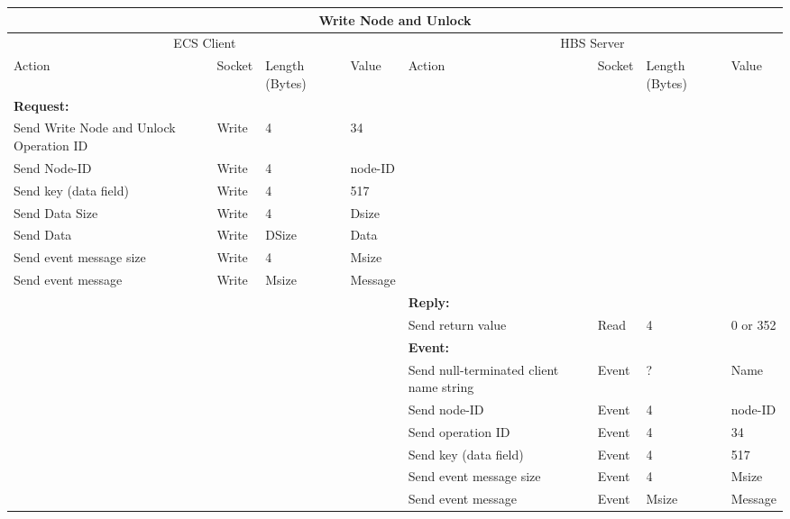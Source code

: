 \bigskip
\small
\begin{tabular}{|p{1.2in}|p{.4in}|p{.4in}|p{.5in}|p{1.2in}|p{.4in}|p{.4in}|p{.5in} |} \hline
\multicolumn{8}{|c|}{{\bf Write Node and Unlock}} \\ \hline
\multicolumn{4}{|c|}{ECS Client} & \multicolumn{4}{|c|}{HBS Server} \\ \hline
Action            & Socket & Length  
                            (Bytes)& Value & Action       & Socket & Length 
                                                                    (Bytes)& Value \\ \hline
\multicolumn{4}{|l}{{\bf Request:}}&\multicolumn{4}{|l|}{~} \\ \hline
Send Write Node and Unlock Operation ID  & Write  & 4     & 34     &              &        &       &       \\ \hline
Send Node-ID      & Write  & 4     &  node-ID &           &        &       &       \\ \hline
Send key (data field)    & Write  & 4     & 517   &              &        &       &       \\ \hline
Send Data Size    & Write  & 4     &  Dsize &        &        &       &       \\ \hline
Send Data         & Write  &  DSize &  Data &   &        &       &       \\ \hline
Send event
message size      & Write  & 4     &  Msize &         &        &       &       \\ \hline
Send event message
                  & Write  &  Msize  &  Message &     &        &       &       \\ \hline
\multicolumn{4}{|l}{~}&\multicolumn{4}{|l|}{{\bf Reply:}} \\ \hline
                  &        &       &       & Send return
                                             value        & Read   &  4
                                             & 0 or 352      \\ \hline
\multicolumn{4}{|l}{~}&\multicolumn{4}{|l|}{{\bf Event:}} \\ \hline
                  &        &       &       & Send null-terminated client
                                             name string  & Event  &  ?    & Name  \\ \hline
                  &        &       &       & Send node-ID  & Event  &   4   &   node-ID    \\  \hline
                  &        &       &       & Send operation 
                                             ID           & Event  &   4   &  34   \\ \hline
                  &        &       &       & Send key (data field)    & Event  &   4   &  517    \\ \hline
                  &        &       &       & Send event message
                                                  size    & Event  &   4   &  Msize \\ \hline
                  &        &       &       & Send event message
                                                          & Event  &  Msize&  Message  \\ \hline
\end{tabular}
\normalsize
\bigskip

